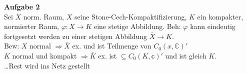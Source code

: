 \documentclass{article}
\begin{document}
\textbf{Aufgabe 2}\\
Sei $X$ norm. Raum, $X$ seine Stone-Cech-Kompaktifizierung, $K$ ein kompakter, normierter Raum, $\varphi:X\rightarrow K$ eine stetige Abbildung.
Beh: $\varphi$ kann eindeutig fortgesetzt werden zu einer stetigen Abbildung $\bar X\rightarrow K$.\\
Bew: $X$ normal $\Rightarrow \bar X$ ex. und ist Teilmenge von $C_0(x,\mathbb{C})'$\\
$K$ normal und kompakt $\Rightarrow \bar K$ ex. ist $\subseteq C_0(K,\mathbb{c})'$ und ist gleich $K$.\\
\ldots Rest wird ins Netz gestellt
\end{document}
